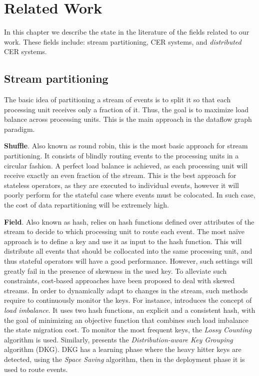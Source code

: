 \chapter{Related Work}\label{chapter:related_work}

In this chapter we describe the state in the literature of the fields related to our work. These fields include: stream partitioning, CER systems, and \emph{distributed} CER systems.

\section{Stream partitioning}\label{sec:stream-partitioning}

The basic idea of partitioning a stream of events is to split it so that each processing unit receives only a fraction of it. Thus, the goal is to maximize load balance across processing units. This is the main approach in the dataflow graph paradigm.

\textbf{Shuffle}. Also known as round robin, this is the most basic approach for stream partitioning. It consists of blindly routing events to the processing units in a circular fashion. A perfect load balance is achieved, as each processing unit will receive exactly an even fraction of the stream. This is the best approach for stateless operators, as they are executed to individual events, however it will poorly perform for the stateful case where events must be colocated. In such case, the cost of data repartitioning will be extremely high.

\textbf{Field}. Also known as hash, relies on hash functions defined over attributes of the stream to decide to which processing unit to route each event. The most na\"ive approach is to define a key and use it as input to the hash function. This will distribute all events that should be collocated into the same processing unit, and thus stateful operators will have a good performance. However, such settings will greatly fail in the presence of skewness in the used key. To alleviate such constraints, cost-based approaches have been proposed to deal with skewed streams. In order to dynamically adapt to changes in the stream, such methods require to continuously monitor the keys. For instance, \cite{DBLP:journals/vldb/Gedik14} introduces the concept of \textit{load imbalance}. It uses two hash functions, an explicit and a consistent hash, with the goal of minimizing an objective function that combines such load imbalance the state migration cost. To monitor the most frequent keys, the \textit{Lossy Counting} algorithm is used. Similarly, \cite{DBLP:conf/debs/RivettiQABS15} presents the \textit{Distribution-aware Key Grouping} algorithm (DKG). DKG has a learning phase where the heavy hitter keys are detected, using the \textit{Space Saving} algorithm, then in the deployment phase it is used to route events.

